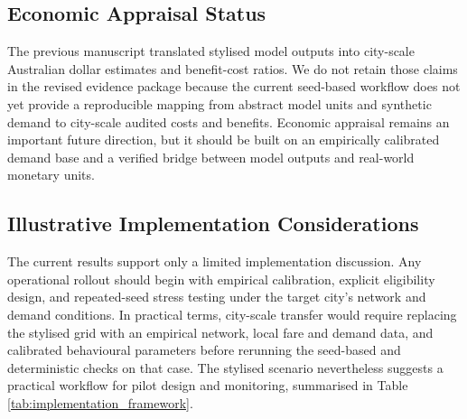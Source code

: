 \documentclass[a4paper,fleqn]{cas-sc}
\begin{document}
\subsection{Economic Appraisal Status}\label{sec:competing-benefits}
The previous manuscript translated stylised model outputs into city-scale Australian dollar estimates and benefit-cost ratios. We do not retain those claims in the revised evidence package because the current seed-based workflow does not yet provide a reproducible mapping from abstract model units and synthetic demand to city-scale audited costs and benefits. Economic appraisal remains an important future direction, but it should be built on an empirically calibrated demand base and a verified bridge between model outputs and real-world monetary units.

\subsection{Illustrative Implementation Considerations}
The current results support only a limited implementation discussion. Any operational rollout should begin with empirical calibration, explicit eligibility design, and repeated-seed stress testing under the target city's network and demand conditions. In practical terms, city-scale transfer would require replacing the stylised grid with an empirical network, local fare and demand data, and calibrated behavioural parameters before rerunning the seed-based and deterministic checks on that case. The stylised scenario nevertheless suggests a practical workflow for pilot design and monitoring, summarised in Table \ref{tab:implementation_framework}.
\end{document}
